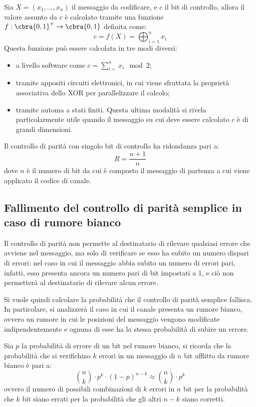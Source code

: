 Sia $X = (x_1, \ldots, x_n)$ il messaggio da codificare, e $c$ il bit di controllo,
allora il valore assunto da $c$ è calcolato tramite una funzione
$f: \cbra{0,1}^+ \rightarrow \cbra{0,1}$ definita come:
\[
    c = f(X) = \bigoplus_{i=1}^{n} x_i
\]
Questa funzione può essere calcolata in tre modi diversi:
\begin{itemize}
    \item a livello software come $c = \sum_{i=}^{n}x_i \mod 2$;
    \item tramite appositi circuiti elettronici, in cui viene sfruttata
    la proprietà associativa dello XOR per parallelizzare il calcolo;
    \item tramite automa a stati finiti. Questa ultima modalità si rivela
    particolarmente utile quando il messaggio su cui deve essere
    calcolato $c$ è di grandi dimensioni.
\end{itemize}

Il controllo di parità con singolo bit di controllo ha ridondanza pari a:
\[
    R = \frac{n+1}{n}
\]
dove $n$ è il numero di bit da cui è composto il messaggio di partenza a cui
viene applicato il codice di canale.

\subsection{Fallimento del controllo di parità semplice in caso di rumore bianco}
Il controllo di parità non permette al destinatario di rilevare qualsiasi
errore che avviene nel messaggio, ma solo di verificare se esso ha subito
un numero dispari di errori: nel caso in cui il messaggio abbia subito un numero
di errori pari, infatti, esso presenta ancora un numero pari di bit impostati
a 1, e ciò non permetterà al destinatario di rilevare alcun errore.

Si vuole quindi calcolare la probabilità che il controllo di parità semplice fallisca.
In particolare, si analizzerà il caso in cui il canale presenta un rumore
bianco, ovvero un rumore in cui le posizioni del messaggio vengono modificate
indipendentemente e ognuna di esse ha la stessa probabilità di subire un errore.

Sia $p$ la probabilità di errore di un bit nel rumore bianco,
si ricorda che la probabilità che si verifichino $k$ errori in un messaggio
di $n$ bit afflitto da rumore bianco è pari a:
\[
    \binom{n}{k} \cdot p^k \cdot (1-p)^{n-k} \approx \binom{n}{k} \cdot p^k
\]
ovvero il numero di possibili combinazioni di $k$ errori in $n$ bit per
la probabilità che $k$ bit siano errati per la probabilità che gli altri $n-k$
siano corretti.

